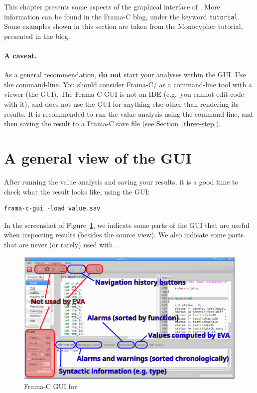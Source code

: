 
This chapter presents some aspects of the graphical interface of \Eva{}. More
information can be found in the Frama-C blog, under the keyword
\texttt{tutorial}.
Some examples shown in this section are taken from the Monocypher tutorial,
presented in the blog.


\paragraph{A caveat.}

As a general recommendation,
  \textbf{do not} start your analyses within the GUI.
  Use the command-line. You should
  consider Frama-C/\Eva{} as a command-line tool with a viewer (the GUI).
  The Frama-C GUI is not an IDE (e.g.~you cannot edit code with it), and
  \Eva{} does not use the GUI for anything else other than rendering its
  results. It is recommended to run the value analysis using the command line,
  and then saving the result to a Frama-C save file
  (see Section~\ref{three-step}).

\section{A general view of the GUI}

After running the value analysis and saving your results,
it is a good time to check what the result looks like, using the GUI:

\begin{verbatim}
frama-c-gui -load value.sav
\end{verbatim}

In the screenshot of Figure~\ref{fig:gui-eva},
we indicate some parts of the GUI that are
useful when inspecting \Eva{} results (besides the source view). We also
indicate some parts that are never (or rarely) used with \Eva{}.

\begin{figure}[hbt]
\centering
\includegraphics[width=\textwidth]{gui-images/gui1-annotated.pdf}
\caption{Frama-C GUI for \Eva{}}
\label{fig:gui-eva}
\end{figure}

